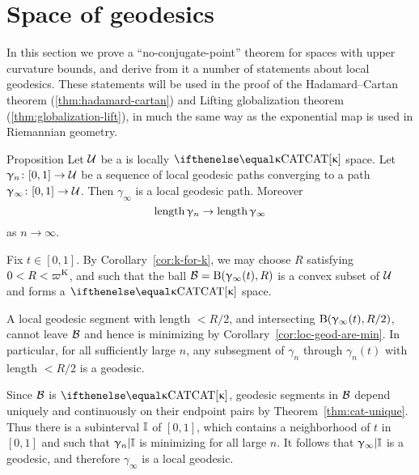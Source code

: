 
\section{Space of geodesics}\label{sec:geod-space}

In this section we prove a  ``no-conjugate-point'' theorem for spaces with upper curvature bounds, and derive from it a number of statements about
local geodesics.  These statements will be used in the proof of the Hadamard--Cartan theorem (\ref{thm:hadamard-cartan}) and Lifting
 globalization theorem (\ref{thm:globalization-lift}), in much the same way as  the exponential map is used in Riemannian geometry.

\begin{thm}{Proposition}\label{prop:geo-complete}
Let $\mathcal{U}$ be a is locally $\CAT\kappa$ space.
 Let $\gamma_n\:[0,1]\to\spc{U}$ be a sequence of local geodesic paths converging to a path $\gamma_\infty\:[0,1]\to\spc{U}$.
Then $\gamma_\infty$ is a local geodesic path.
Moreover 
\[\length\gamma_n\to\length\gamma_\infty\]
as $n\to\infty$.
\end{thm}

Fix $t\in[0,1]$.
By Corollary~\ref{cor:k-for-k}, we may choose $R$ satisfying $0<R<\varpi\Kappa$,
and such that
the ball $\mathcal{B}=\mathrm{B}{}(\upgamma_\infty(t),R)$ is a convex subset of $\mathcal{U}$ and forms a $\CAT\kappa$ space.



A local geodesic segment  with length $<R/2$, and intersecting $\mathrm{B}{}(\upgamma_\infty(t),R/2)$, cannot leave $\mathcal{B}$ and hence  is  minimizing by Corollary~\ref{cor:loc-geod-are-min}.  In particular, for all sufficiently large $n$, any subsegment  of $\gamma_n$ through $\gamma_n(t)$  with length $<R/2$ is a geodesic.


Since $\mathcal{B}$ is $\CAT\kappa$, geodesic segments in $\mathcal{B}$ depend uniquely and continuously on their endpoint pairs by Theorem~\ref{thm:cat-unique}.  
Thus there is a subinterval $\mathbb{I}$ of $[0,1]$,
which contains a neighborhood of $t$ in $[0,1]$
and such that $\upgamma_n|\mathbb{I}$ is minimizing for all large $n$.
It follows that $\upgamma_\infty|\mathbb{I}$ is a geodesic,
and therefore $\gamma_\infty$ is a local geodesic.
\qeds

